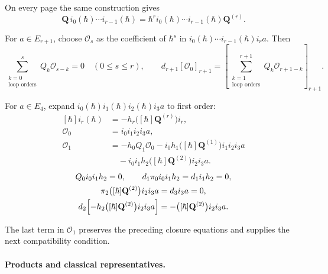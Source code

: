\documentclass[11pt]{article}
\numberwithin{equation}{section}
\numberwithin{figure}{section}
\numberwithin{table}{section}
\begin{document}
On every page the same construction gives
\begin{equation}\label{eq-page-representative-chain}
\mathbf Q\,i_0(\hbar)\cdots i_{r-1}(\hbar)
=\hbar^r i_0(\hbar)\cdots i_{r-1}(\hbar)\mathbf Q^{(r)}.
\end{equation}

For $a\in E_{r+1}$, choose $\mathcal O_s$ as the coefficient of $\hbar^s$ in $i_0(\hbar)\cdots i_{r-1}(\hbar)i_ra$. Then
\begin{equation}\label{eq-2-75}
\sum_{\substack{k=0\\\text{loop orders}}}^{s}Q_k\mathcal O_{s-k}=0\quad(0\le s\le r),
\qquad
d_{r+1}[\mathcal O_0]_{r+1}
=\left[\sum_{\substack{k=1\\\text{loop orders}}}^{r+1}Q_k\mathcal O_{r+1-k}\right]_{r+1}.
\end{equation}

For $a\in E_4$, expand $i_0(\hbar)i_1(\hbar)i_2(\hbar)i_3a$ to first order:
\begin{equation}\label{local-5a4a4408-fb00-44ca-9386-984ed2933cca}
\begin{aligned}
[\hbar]i_r(\hbar)&=-h_r\bigl([\hbar]\mathbf Q^{(r)}\bigr)i_r,\\
\mathcal O_0&=i_0i_1i_2i_3a,\\
\mathcal O_1&=-h_0Q_1\mathcal O_0
-i_0h_1\bigl([\hbar]\mathbf Q^{(1)}\bigr)i_1i_2i_3a\\
&\quad-i_0i_1h_2\bigl([\hbar]\mathbf Q^{(2)}\bigr)i_2i_3a.
\end{aligned}
\end{equation}
\begin{equation}\label{local-ch8-lower-page-cocycle-check}
\begin{gathered}
Q_0i_0i_1h_2=0,\qquad d_1\pi_0i_0i_1h_2=d_1i_1h_2=0,\\
\pi_2\bigl([\hbar]\mathbf Q^{(2)}\bigr)i_2i_3a=d_3i_3a=0,\\
d_2\Bigl[-h_2\bigl([\hbar]\mathbf Q^{(2)}\bigr)i_2i_3a\Bigr]
=-\bigl([\hbar]\mathbf Q^{(2)}\bigr)i_2i_3a.
\end{gathered}
\end{equation}

The last term in $\mathcal O_1$ preserves the preceding closure equations and supplies the next compatibility condition.

\paragraph{Products and classical representatives.}\label{products-and-classical-representatives}
\end{document}

